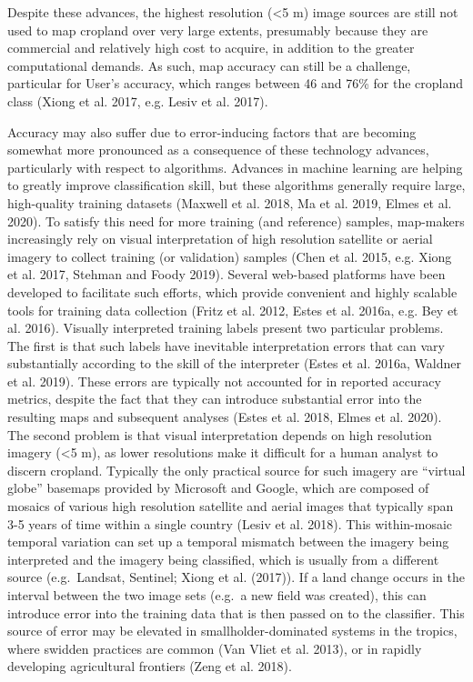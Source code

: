 \documentclass[11pt,a4paper]{article}
\begin{document}
Despite these advances, the highest resolution (\textless5 m) image
sources are still not used to map cropland over very large extents,
presumably because they are commercial and relatively high cost to
acquire, in addition to the greater computational demands. As such, map
accuracy can still be a challenge, particular for User's accuracy, which
ranges between 46 and 76\% for the cropland class (Xiong et al. 2017,
e.g. Lesiv et al. 2017).

Accuracy may also suffer due to error-inducing factors that are becoming
somewhat more pronounced as a consequence of these technology advances,
particularly with respect to algorithms. Advances in machine learning
are helping to greatly improve classification skill, but these
algorithms generally require large, high-quality training datasets
(Maxwell et al. 2018, Ma et al. 2019, Elmes et al. 2020). To satisfy
this need for more training (and reference) samples, map-makers
increasingly rely on visual interpretation of high resolution satellite
or aerial imagery to collect training (or validation) samples (Chen et
al. 2015, e.g. Xiong et al. 2017, Stehman and Foody 2019). Several
web-based platforms have been developed to facilitate such efforts,
which provide convenient and highly scalable tools for training data
collection (Fritz et al. 2012, Estes et al. 2016a, e.g. Bey et al.
2016). Visually interpreted training labels present two particular
problems. The first is that such labels have inevitable interpretation
errors that can vary substantially according to the skill of the
interpreter (Estes et al. 2016a, Waldner et al. 2019). These errors are
typically not accounted for in reported accuracy metrics, despite the
fact that they can introduce substantial error into the resulting maps
and subsequent analyses (Estes et al. 2018, Elmes et al. 2020). The
second problem is that visual interpretation depends on high resolution
imagery (\textless5 m), as lower resolutions make it difficult for a
human analyst to discern cropland. Typically the only practical source
for such imagery are ``virtual globe'' basemaps provided by Microsoft
and Google, which are composed of mosaics of various high resolution
satellite and aerial images that typically span 3-5 years of time within
a single country (Lesiv et al. 2018). This within-mosaic temporal
variation can set up a temporal mismatch between the imagery being
interpreted and the imagery being classified, which is usually from a
different source (e.g.~Landsat, Sentinel; Xiong et al. (2017)). If a
land change occurs in the interval between the two image sets (e.g.~a
new field was created), this can introduce error into the training data
that is then passed on to the classifier. This source of error may be
elevated in smallholder-dominated systems in the tropics, where swidden
practices are common (Van Vliet et al. 2013), or in rapidly developing
agricultural frontiers (Zeng et al. 2018).
\end{document}
